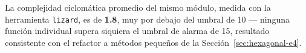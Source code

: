 La complejidad ciclomática promedio del mismo módulo, medida con la herramienta \texttt{lizard},
es de \textbf{1.8}, muy por debajo del umbral de 10 — ninguna función individual supera siquiera
el umbral de alarma de 15, resultado consistente con el refactor a métodos pequeños de la
Sección~\ref{sec:hexagonal-e4}.
